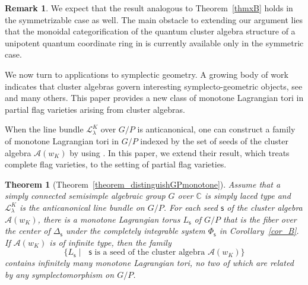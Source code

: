 \documentclass[11pt]{amsart}
\newcommand{\C}{\mathbb{C}}
\numberwithin{equation}{section}
\theoremstyle{plain}
\newtheorem{thmx}{Theorem}
\theoremstyle{definition}
\newtheorem{remark}[theorem]{Remark}
\numberwithin{equation}{section}
\newcommand{\seed}{\mathsf{s}}
\begin{document}
\begin{remark}
We expect that the result analogous to Theorem~\ref{thmxB} holds in the symmetrizable case as well. The main obstacle to extending our argument lies that the monoidal categorification of the quantum cluster algebra structure of a unipotent quantum coordinate ring in \cite{KKKO18, KKOP21, KKOP23} is currently available only in the symmetric case. 
\end{remark}

We now turn to applications to symplectic geometry. A growing body of work indicates that cluster algebras govern interesting symplecto-geometric objects, see \cite{Aurouxinfinitely, Via16, Via17, CG22, CG24, ABL25, ABR25, CKKP25} and many others. This paper provides a new class of monotone Lagrangian tori in partial flag varieties arising from cluster algebras.

When the line bundle $\mathcal{L}^K_\lambda$ over $G/P$ is anticanonical, one can construct a family of monotone Lagrangian tori in $G/P$ indexed by the set of seeds of the cluster algebra $\mathcal{A}(w_K)$ by using \cite[Propositions A and B]{CKKP25}. In this paper, we extend their result, which treats complete flag varieties, to the setting of partial flag varieties.

\begin{thmx}[Theorem~\ref{theorem_distinguishGPmonotone}]\label{thmxD}
Assume that a simply connected semisimple algebraic group $G$ over $\C$ is simply laced type and $\mathcal{L}^K_\lambda$ is the anticanonical line bundle on $G/P$. For each seed $\seed$ of the cluster algebra $\mathcal{A}(w_K)$, there is a monotone Lagrangian torus $L_\seed$ of $G/P$ that is the fiber over the center of $\Delta_\seed$ under the completely integrable system $\Phi_\seed$ in Corollary~\ref{cor_B}. If $\mathcal{A}(w_K)$ is of infinite type, then the family 
$$
\bigl\{L_\seed \mid \mbox{ $\seed$ is a seed of the cluster algebra $\mathcal{A}(w_K)$} \bigr\}
$$ 
contains infinitely many monotone Lagrangian tori, no two of which are related by any symplectomorphism on $G/P$.
\end{thmx}
\end{document}

